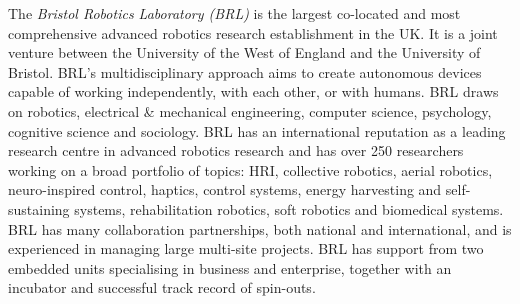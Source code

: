 \documentclass[11pt]{report}
\begin{document}
The \emph{Bristol Robotics Laboratory (BRL)} is the largest co-located
and most comprehensive advanced robotics research establishment in the
UK. It is a joint venture between the University of the West of England
and the University of Bristol. BRL's multidisciplinary approach aims to
create autonomous devices capable of working independently, with each
other, or with humans. BRL draws on robotics, electrical \& mechanical
engineering, computer science, psychology, cognitive science and
sociology. BRL has an international reputation as a leading research
centre in advanced robotics research and has over 250 researchers
working on a broad portfolio of topics: HRI, collective robotics, aerial
robotics, neuro-inspired control, haptics, control systems, energy
harvesting and self-sustaining systems, rehabilitation robotics, soft
robotics and biomedical systems. BRL has many collaboration
partnerships, both national and international, and is experienced in
managing large multi-site projects. BRL has support from two embedded
units specialising in business and enterprise, together with an
incubator and successful track record of spin-outs.

\newpage

\printbibliography
\end{document}
